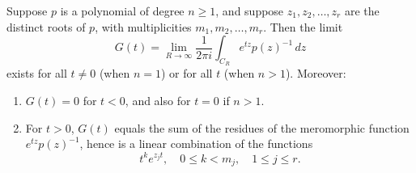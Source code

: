 Suppose $p$ is a polynomial of degree $n \geq 1$, and suppose $z_1, z_2, \ldots, z_r$ are the distinct roots of $p$, with multiplicities $m_1, m_2, \ldots, m_r$. Then the limit
$$G(t) = \lim_{R \to \infty} \frac{1}{2\pi i} \int_{C_R} e^{tz} p(z)^{-1} \, dz$$
exists for all $t \neq 0$ (when $n = 1$) or for all $t$ (when $n > 1$). Moreover:
\begin{enumerate}
\item $G(t) = 0$ for $t < 0$, and also for $t = 0$ if $n > 1$.
\item For $t > 0$, $G(t)$ equals the sum of the residues of the meromorphic function $e^{tz} p(z)^{-1}$, hence is a linear combination of the functions
$$t^k e^{z_j t}, \quad 0 \leq k < m_j, \quad 1 \leq j \leq r.$$
\end{enumerate}
